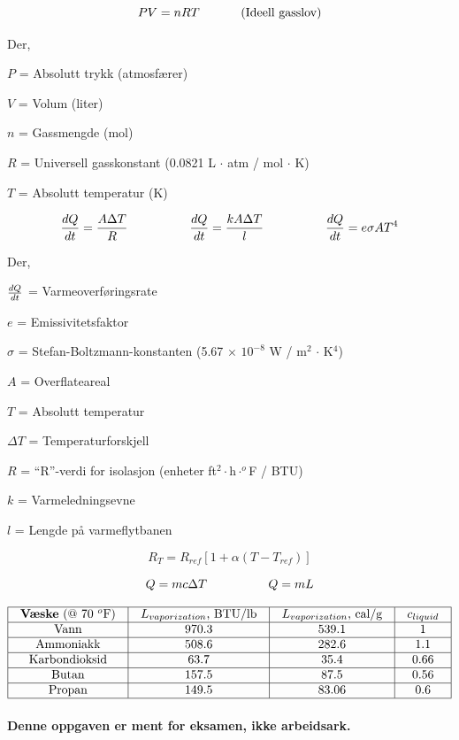 

$$PV = nRT \hbox{ \hskip 30pt (Ideell gasslov)}$$

\noindent
Der,

$P$ = Absolutt trykk (atmosfærer)

$V$ = Volum (liter)

$n$ = Gassmengde (mol)

$R$ = Universell gasskonstant (0.0821 L $\cdot$ atm / mol $\cdot$ K)

$T$ = Absolutt temperatur (K)

\vskip 50pt

$${dQ \over dt} = {{A \Delta T} \over R} \hskip 50pt {dQ \over dt} = {{k A \Delta T} \over l} \hskip 50pt {dQ \over dt} = e \sigma A T^4$$

\noindent
Der,

$dQ \over dt$ = Varmeoverføringsrate

$e$ = Emissivitetsfaktor

$\sigma$ = Stefan-Boltzmann-konstanten (5.67 $\times$ $10^{-8}$ W / m$^{2}$ $\cdot$ K$^{4}$)

$A$ = Overflateareal

$T$ = Absolutt temperatur

$\Delta T$ = Temperaturforskjell

$R$ = ``R''-verdi for isolasjon (enheter ft$^{2} \cdot$h$\cdot ^{o}$F / BTU)

$k$ = Varmeledningsevne

$l$ = Lengde på varmeflytbanen

\vskip 50pt

$$R_T = R_{ref} \left[1 + \alpha (T - T_{ref}) \right]$$

\vskip 10pt

$$Q = mc \Delta T \hskip 50 pt Q = mL$$

\vskip 10pt


$$\vbox{\offinterlineskip
\halign{\strut
\vrule \quad\hfil # \ \hfil &
\vrule \quad\hfil # \ \hfil &
\vrule \quad\hfil # \ \hfil &
\vrule \quad\hfil # \ \hfil \vrule \cr
\noalign{\hrule}
%
{\bf Væske} (@ 70 $^{o}$F) & $L_{vaporization}$, BTU/lb & $L_{vaporization}$, cal/g & $c_{liquid}$ \cr
%
\noalign{\hrule}
%
Vann & 970.3 & 539.1 & 1 \cr
%
\noalign{\hrule}
%
Ammoniakk & 508.6 & 282.6 & 1.1 \cr
%
\noalign{\hrule}
%
Karbondioksid & 63.7 & 35.4 & 0.66 \cr
%
\noalign{\hrule}
%
Butan & 157.5 & 87.5 & 0.56 \cr
%
\noalign{\hrule}
%
Propan & 149.5 & 83.06 & 0.6 \cr
%
\noalign{\hrule}
} %
}$$ %















{\bf Denne oppgaven er ment for eksamen, ikke arbeidsark.}

